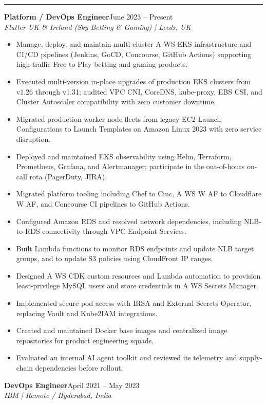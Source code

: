 \documentclass[letterpaper,10pt]{article}
\newcommand{\cvSection}[1]{\vspace{8pt}\noindent{\large\bfseries #1}\par\vspace{2pt}\hrule\vspace{4pt}}
\newcommand{\resumeRole}[4]{\Needspace{5\baselineskip}\textbf{#1}\hfill #2\\\textit{#3 | #4}\par\vspace{-3pt}}
\begin{document}
\cvSection{W\kern0pt ork Experience}
\resumeRole{Platform / DevOps Engineer}{June 2023 -- Present}{Flutter UK \& Ireland (Sky Betting \& Gaming)}{Leeds, UK}
\begin{itemize}
\item Manage, deploy, and maintain multi-cluster A\kern0pt WS EKS infrastructure and CI/CD pipelines (Jenkins, GoCD, Concourse, GitHub Actions) supporting high-tra{}ffic Free to Play betting and gaming products.
\item Executed multi-version in-place upgrades of production EKS clusters from v1.26 through v1.31; audited VPC CNI, CoreDNS, kube-proxy, EBS CSI, and Cluster Autoscaler compatibility with zero customer downtime.
\item Migrated production worker node fleets from legacy EC2 Launch Configurations to Launch Templates on Amazon Linux 2023 with zero service disruption.
\item Deployed and maintained EKS observability using Helm, Terraform, Prometheus, Grafana, and Alertmanager; participate in the out-of-hours on-call rota (PagerDuty, JIRA).
\item Migrated platform tooling including Chef to Cinc, A\kern0pt WS W\kern0pt AF to Cloudflare W\kern0pt AF, and Concourse CI pipelines to GitHub Actions.
\item Configured Amazon RDS and resolved network dependencies, including NLB-to-RDS connectivity through VPC Endpoint Services.
\item Built Lambda functions to monitor RDS endpoints and update NLB target groups, and to update S3 policies using CloudFront IP ranges.
\item Designed A\kern0pt WS CDK custom resources and Lambda automation to provision least-privilege MySQL users and store credentials in A\kern0pt WS Secrets Manager.
\item Implemented secure pod access with IRSA and External Secrets Operator, replacing Vault and Kube2IAM integrations.
\item Created and maintained Docker base images and centralized image repositories for product engineering squads.
\item Evaluated an internal AI agent toolkit and reviewed its telemetry and supply-chain dependencies before rollout.
\end{itemize}
\resumeRole{DevOps Engineer}{April 2021 -- May 2023}{IBM}{Remote / Hyderabad, India}
\end{document}
